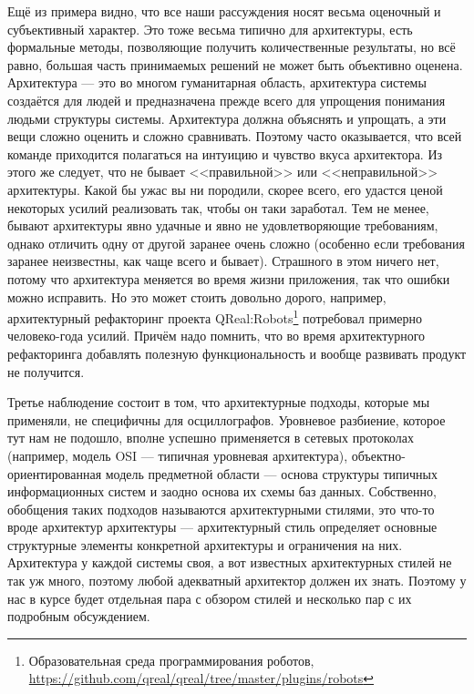 \documentclass{../../text-style}
\begin{document}
Ещё из примера видно, что все наши рассуждения носят весьма оценочный и субъективный характер. Это тоже весьма типично для архитектуры, есть формальные методы, позволяющие получить количественные результаты, но всё равно, большая часть принимаемых решений не может быть объективно оценена. Архитектура --- это во многом гуманитарная область, архитектура системы создаётся для людей и предназначена прежде всего для упрощения понимания людьми структуры системы. Архитектура должна объяснять и упрощать, а эти вещи сложно оценить и сложно сравнивать. Поэтому часто оказывается, что всей команде приходится полагаться на интуицию и чувство вкуса архитектора. Из этого же следует, что не бывает <<правильной>> или <<неправильной>> архитектуры. Какой бы ужас вы ни породили, скорее всего, его удастся ценой некоторых усилий реализовать так, чтобы он таки заработал. Тем не менее, бывают архитектуры явно удачные и явно не удовлетворяющие требованиям, однако отличить одну от другой заранее очень сложно (особенно если требования заранее неизвестны, как чаще всего и бывает). Страшного в этом ничего нет, потому что архитектура меняется во время жизни приложения, так что ошибки можно исправить. Но это может стоить довольно дорого, например, архитектурный рефакторинг проекта QReal:Robots\footnote{Образовательная среда программирования роботов, \url{https://github.com/qreal/qreal/tree/master/plugins/robots}} потребовал примерно человеко-года усилий. Причём надо помнить, что во время архитектурного рефакторинга добавлять полезную функциональность и вообще развивать продукт не получится.

Третье наблюдение состоит в том, что архитектурные подходы, которые мы применяли, не специфичны для осциллографов. Уровневое разбиение, которое тут нам не подошло, вполне успешно применяется в сетевых протоколах (например, модель OSI --- типичная уровневая архитектура), объектно-ориентированная модель предметной области --- основа структуры типичных информационных систем и заодно основа их схемы баз данных. Собственно, обобщения таких подходов называются архитектурными стилями, это что-то вроде архитектур архитектуры --- архитектурный стиль определяет основные структурные элементы конкретной архитектуры и ограничения на них. Архитектура у каждой системы своя, а вот известных архитектурных стилей не так уж много, поэтому любой адекватный архитектор должен их знать. Поэтому у нас в курсе будет отдельная пара с обзором стилей и несколько пар с их подробным обсуждением.
\end{document}
